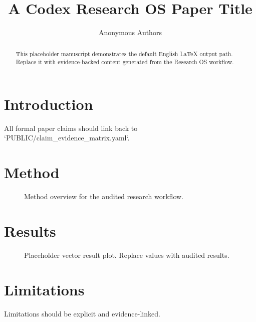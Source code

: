 \documentclass[10pt]{article}
\title{A Codex Research OS Paper Title}
\author{Anonymous Authors}
\date{}
\begin{document}
\maketitle

\begin{abstract}
This placeholder manuscript demonstrates the default English LaTeX output path. Replace it with evidence-backed content generated from the Research OS workflow.
\end{abstract}

\section{Introduction}

All formal paper claims should link back to `PUBLIC/claim_evidence_matrix.yaml`.

\section{Method}

\begin{figure}[t]
  \centering
  
  \caption{Method overview for the audited research workflow.}
  \label{fig:method}
\end{figure}

\section{Results}

\begin{figure}[t]
  \centering
  
  \caption{Placeholder vector result plot. Replace values with audited results.}
  \label{fig:results}
\end{figure}

\section{Limitations}

Limitations should be explicit and evidence-linked.




\appendix

\end{document}
